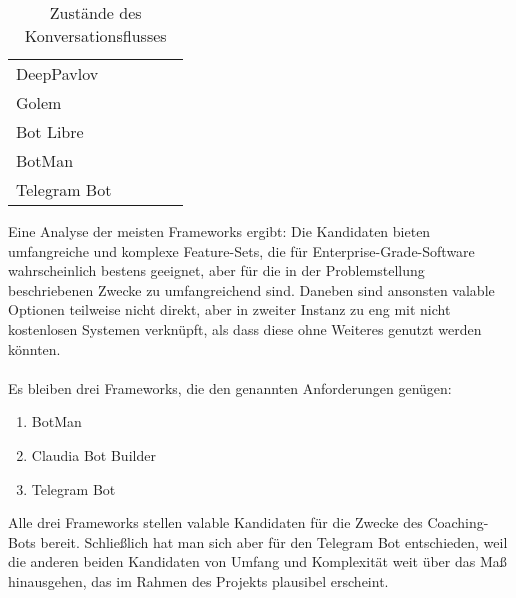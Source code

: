 \begin{table}
\begin{tabular}{l | l l l l}
                DeepPavlov 				&		    		    &		                &                       &                       &                           \\
                Golem 				&		    		    &		                &                       &                       &                           \\
                Bot Libre 				&		    		    &		                &                       &                       &                           \\
                BotMan 				&		    		    &		                &                       &                       &                           \\
                Telegram Bot 				&		    		    &		                &                       &                       &                           \\
                
            \end{tabular}
            \caption{Zustände des Konversationsflusses}
            \label{tab: states}
        \end{table}
        Eine Analyse der meisten Frameworks ergibt: Die Kandidaten bieten umfangreiche und komplexe Feature-Sets, die für Enterprise-Grade-Software wahrscheinlich bestens geeignet, aber für die in der Problemstellung beschriebenen Zwecke zu umfangreichend sind. Daneben sind ansonsten valable Optionen teilweise nicht direkt, aber in zweiter Instanz zu eng mit nicht kostenlosen Systemen verknüpft, als dass diese ohne Weiteres genutzt werden könnten. \\ 
        \\
        Es bleiben drei Frameworks, die den genannten Anforderungen genügen:
        \begin{enumerate}
            \item BotMan
            \item Claudia Bot Builder
            \item Telegram Bot
        \end{enumerate}

        Alle drei Frameworks stellen valable Kandidaten für die Zwecke des Coaching-Bots bereit. Schließlich hat man sich aber für den Telegram Bot entschieden, weil die anderen beiden Kandidaten von Umfang und Komplexität weit über das Maß hinausgehen, das im Rahmen des Projekts plausibel erscheint.
